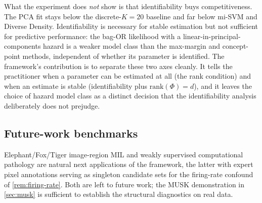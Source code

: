 What the experiment does \emph{not} show is that identifiability
buys competitiveness. The PCA fit stays below the discrete-$K = 20$
baseline and far below mi-SVM and Diverse Density. Identifiability is
necessary for stable estimation but not sufficient for predictive
performance: the bag-OR likelihood with a linear-in-principal-
components hazard is a weaker model class than the max-margin and
concept-point methods, independent of whether its parameter is
identified. The framework's contribution is to separate these two
axes cleanly. It tells the practitioner when a parameter can be
estimated at all (the rank condition) and when an estimate is
stable (identifiability plus $\mathrm{rank}(\Phi) = d$), and it
leaves the choice of hazard model class as a distinct decision that
the identifiability analysis deliberately does not prejudge.

\subsection{Future-work benchmarks}

Elephant/Fox/Tiger image-region MIL \citep{andrews2003support} and
weakly supervised computational pathology
\citep{campanella2019clinical,lu2021data,bejnordi2017diagnostic} are
natural next applications of the framework, the latter with expert
pixel annotations serving as singleton candidate sets for the
firing-rate confound of \cref{rem:firing-rate}. Both are left to
future work; the MUSK demonstration in \cref{sec:musk} is
sufficient to establish the structural diagnostics on real data.
